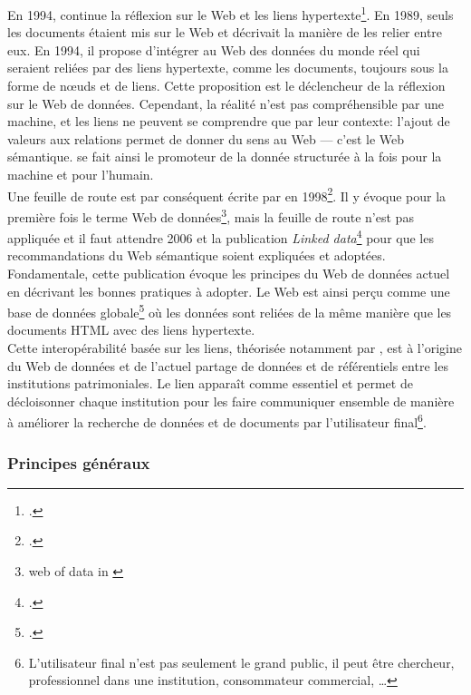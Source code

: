 En 1994,  continue la réflexion sur le Web et les liens hypertexte\footcite{berners-lee_plenary_1994}. En 1989, seuls les documents étaient mis sur le Web et  décrivait la manière de les relier entre eux. En 1994, il propose d'intégrer au Web des données du monde réel qui seraient reliées par des liens hypertexte, comme les documents, toujours sous la forme de nœuds et de liens. Cette proposition est le déclencheur de la réflexion sur le Web de données. Cependant, la réalité n'est pas compréhensible par une machine, et les liens ne peuvent se comprendre que par leur contexte: l'ajout de valeurs aux relations permet de donner du sens au Web --- c'est le Web sémantique.  se fait ainsi le promoteur de la donnée structurée à la fois pour la machine et pour l'humain.\\

Une feuille de route est par conséquent écrite par  en 1998\footcite{berners-lee_semantic_1998}. Il y évoque pour la première fois le terme \og Web de données\fg{}\footnote{\og web of data\fg{} in \cite{berners-lee_semantic_1998}}, mais la feuille de route n'est pas appliquée et il faut attendre 2006 et la publication \textit{Linked data}\footcite{berners-lee_linked_2006} pour que les recommandations du Web sémantique soient expliquées et adoptées. Fondamentale, cette publication évoque les principes du Web de données actuel en décrivant les bonnes pratiques à adopter. Le Web est ainsi perçu comme une \og base de données globale\fg{}\footcite[§29]{bermes_convergence_2013} où les données sont reliées de la même manière que les documents HTML avec des liens hypertexte.\\

Cette interopérabilité basée sur les liens, théorisée notamment par , est à l'origine du Web de données et de l'actuel partage de données et de référentiels entre les institutions patrimoniales. Le lien apparaît comme essentiel et permet de décloisonner chaque institution pour les faire communiquer ensemble de manière à améliorer la recherche de données et de documents par l'utilisateur final\footnote{L'utilisateur final n'est pas seulement le grand public, il peut être chercheur, professionnel dans une institution, consommateur commercial, \dots}.

\subsubsection{\label{II-A-1-a-ii}Principes généraux}

